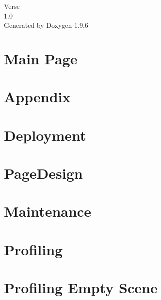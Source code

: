 \documentclass[twoside]{book}
\newcommand{\+}{\discretionary{\mbox{\scriptsize$\hookleftarrow$}}{}{}}
\newcommand{\clearemptydoublepage}{%
    \newpage{\pagestyle{empty}\cleardoublepage}%
  }
\begin{document}
  \raggedbottom
    \hypersetup{pageanchor=false,
                bookmarksnumbered=true,
                pdfencoding=unicode
               }
  \begin{titlepage}
  \vspace*{7cm}
  \begin{center}%
  {\Large Verse}\\
  [1ex]\large 1.\+0 \\
  \vspace*{1cm}
  {\large Generated by Doxygen 1.9.6}\\
  \end{center}
  \end{titlepage}
  \clearemptydoublepage
  \tableofcontents
  \clearemptydoublepage
  \hypersetup{pageanchor=true}
\chapter{Main Page}
\label{index}\hypertarget{index}{}
\chapter{Appendix}
\label{_page_appendix}

\chapter{Deployment}
\label{_page_deployment}

\chapter{Page\+Design}
\label{_page_design}

\chapter{Maintenance}
\label{_page_maintenance}

\chapter{Profiling}
\label{_page_profiling}

\chapter{Profiling Empty Scene}
\label{_page_profiling_empty_scene}

\end{document}
